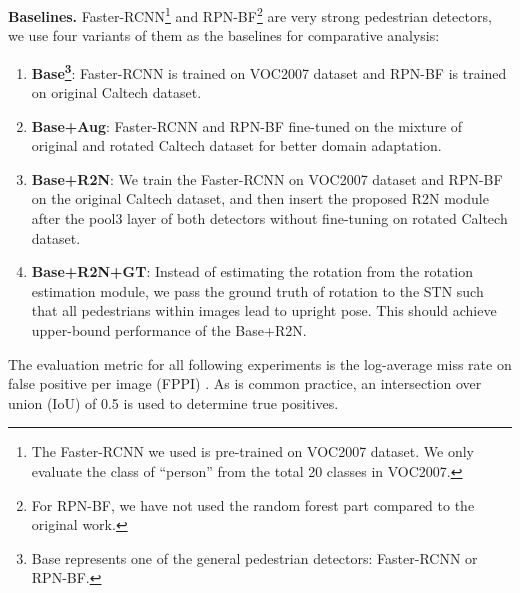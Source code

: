 \documentclass[10pt,twocolumn,letterpaper]{article}
\begin{document}
\vspace{1mm}
\noindent\textbf{Baselines.} Faster-RCNN\footnote{The Faster-RCNN we used is pre-trained on VOC2007 dataset. We only evaluate the class of ``person'' from the total 20 classes in VOC2007.} \cite{Ren2015} and RPN-BF\footnote{For RPN-BF, we have not used the random forest part compared to the original work.} \cite{Zhang2016} are very strong pedestrian detectors, we use four variants of them as the baselines for comparative analysis: 

\vspace{-0.3cm}
\begin{enumerate}
    \setlength\topsep{-1.5mm}
    \setlength\itemsep{-1.5mm}
    \item \textbf{Base\footnote{Base represents one of the general pedestrian detectors: Faster-RCNN or RPN-BF.}}: Faster-RCNN is trained on VOC2007 dataset and RPN-BF is trained on original Caltech dataset.
    \item \textbf{Base+Aug}: Faster-RCNN and RPN-BF fine-tuned on the mixture of original and rotated Caltech dataset for better domain adaptation.
    \item \textbf{Base+R2N}: We train the Faster-RCNN on VOC2007 dataset and RPN-BF on the original Caltech dataset, and then insert the proposed R2N module after the pool3 layer of both detectors without fine-tuning on rotated Caltech dataset.
    \item \textbf{Base+R2N+GT}: Instead of estimating the rotation from the rotation estimation module, we pass the ground truth of rotation to the STN such that all pedestrians within images lead to upright pose. This should achieve upper-bound performance of the Base+R2N.
    \end{enumerate}
\vspace{-0.2cm}

The evaluation metric for all following experiments is the log-average miss rate on false positive per image (FPPI) \cite{Dollar2012}. As is common practice, an intersection over union (IoU) of 0.5 is used to determine true positives. 
\end{document}

